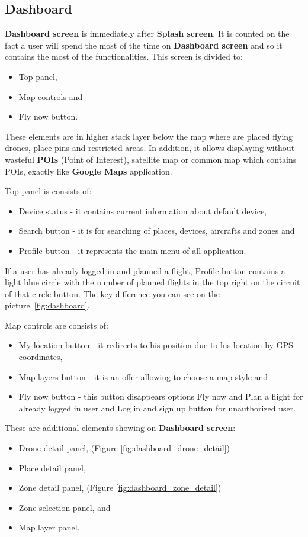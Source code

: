 \subsection{Dashboard}\label{subsec:dashboard2}

\textbf{Dashboard screen} is immediately after \textbf{Splash screen}.
It is counted on the fact a user will spend the most of the time on \textbf{Dashboard screen} and so it contains the most of the functionalities.
This screen is divided to:
\begin{itemize}
    \item Top panel,
    \item Map controls and
    \item Fly now button.
\end{itemize}
These elements are in higher stack layer below the map where are placed flying drones, place pins and restricted areas.
In addition, it allows displaying without wasteful \textbf{POIs} (Point of Interest)\cite{poi}, satellite map or common map which contains POIs, exactly like \textbf{Google Maps} application.

Top panel is consists of:
\begin{itemize}
    \item Device status - it contains current information about default device,
    \item Search button - it is for searching of places, devices, aircrafts and zones and
    \item Profile button - it represents the main menu of all application.
\end{itemize}
If a user has already logged in and planned a flight, Profile button contains a light blue circle with the number of planned flights in the top right on the circuit of that circle button.
The key difference you can see on the picture~\ref{fig:dashboard}.

Map controls are consists of:
\begin{itemize}
    \item My location button - it redirects to his position due to his location by GPS coordinates,
    \item Map layers button - it is an offer allowing to choose a map style and
    \item Fly now button - this button disappears options Fly now and Plan a flight for already logged in user and Log in and sign up button for unauthorized user.
\end{itemize}
These are additional elements showing on \textbf{Dashboard screen}:
\begin{itemize}
    \item Drone detail panel, (Figure \ref{fig:dashboard_drone_detail})
    \item Place detail panel,
    \item Zone detail panel, (Figure \ref{fig:dashboard_zone_detail})
    \item Zone selection panel, and
    \item Map layer panel.
\end{itemize}

